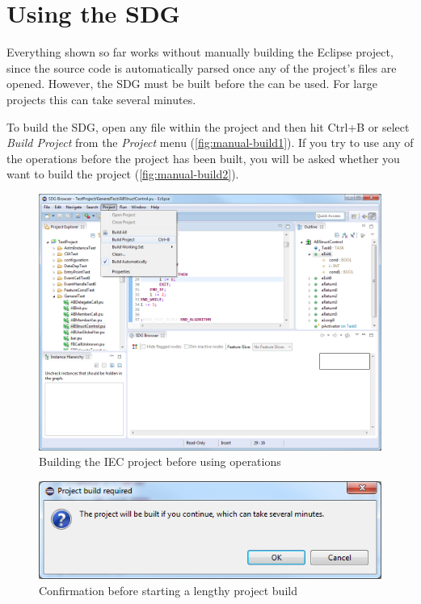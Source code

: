 \section{Using the SDG} \label{sec:manual-sdg}

Everything shown so far works without manually building the Eclipse project, since the source code is automatically 
parsed once any of the project's files are opened. However, the SDG must be built before the \SB can be used. For large 
projects this can take several minutes.

To build the SDG, open any file within the project and then hit Ctrl+B or select \emph{Build Project} from the 
\emph{Project} menu (\autoref{fig:manual-build1}). If you try to use any of the \SB operations before the project has 
been built, you will be asked whether you want to build the project (\autoref{fig:manual-build2}).

\begin{figure}[hp]
  \centering
    \includegraphics[width=\textwidth]{bilder/manual-build1}
  \caption{Building the IEC project before using \SB operations}
  \label{fig:manual-build1}
\end{figure}

\begin{figure}[hp]
  \centering
    \includegraphics[scale=0.55]{bilder/manual-build2}
  \caption{Confirmation before starting a lengthy project build}
  \label{fig:manual-build2}
\end{figure}

